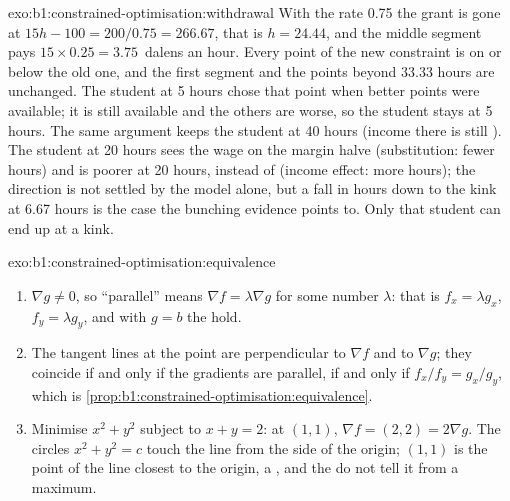 \begin{solution}{exo:b1:constrained-optimisation:withdrawal}
With the rate 0.75 the grant is gone at $15h - 100 = 200/0.75 = 266.67$, that
is $h = 24.44$, and the middle segment pays $15 \times 0.25 = \num{3.75}$~dalens an
hour. Every point of the new constraint is on or below the old one, and the
first segment and the points beyond 33.33 hours are unchanged. The student at
5 hours chose that point when better points were available; it is still
available and the others are worse, so the student stays at 5 hours. The same
argument keeps the student at 40 hours (income there is still ). The
student at 20 hours sees the wage on the margin halve (substitution: fewer
hours) and is poorer at 20 hours,  instead of  (income
effect: more hours); the direction is not settled by the model alone, but a
fall in hours down to the kink at 6.67 hours is the case the bunching
evidence points to. Only that student can end up at a kink.
\end{solution}

\begin{solution}{exo:b1:constrained-optimisation:equivalence}
\begin{enumerate}
  \item $\nabla g \neq 0$, so ``parallel'' means $\nabla f = \lambda \nabla g$ for
    some number $\lambda$: that is $f_x = \lambda g_x$, $f_y = \lambda g_y$, and
    with $g = b$ the  hold.
  \item The tangent lines at the point are perpendicular to $\nabla f$ and to
    $\nabla g$; they coincide if and only if the gradients are parallel, if and
    only if $f_x/f_y = g_x/g_y$, which is
    \cref{prop:b1:constrained-optimisation:equivalence}.
  \item Minimise $x^2 + y^2$ subject to $x + y = 2$: at $(1, 1)$,
    $\nabla f = (2, 2) = 2\nabla g$. The circles $x^2 + y^2 = c$ touch the line
    from the side of the origin; $(1, 1)$ is the point of the line closest to
    the origin, a , and the  do not tell
    it from a maximum.
\end{enumerate}
\end{solution}

